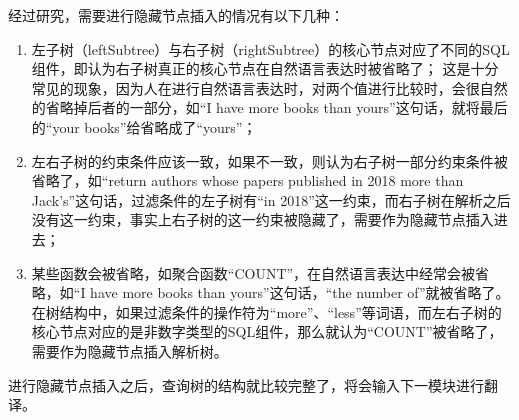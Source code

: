 经过研究，需要进行隐藏节点插入的情况有以下几种：
\begin{enumerate}
    \item 左子树（leftSubtree）与右子树（rightSubtree）的核心节点对应了不同的SQL组件，即认为右子树真正的核心节点在自然语言表达时被省略了\cite{zeng2014breaking}；
    这是十分常见的现象，因为人在进行自然语言表达时，对两个值进行比较时，会很自然的省略掉后者的一部分，如“I have more books than yours”这句话，就将最后的“your books”给省略成了“yours”；
    \item 左右子树的约束条件应该一致，如果不一致，则认为右子树一部分约束条件被省略了，如“return authors whose papers published in 2018 more than Jack’s”这句话，过滤条件的左子树有“in 2018”这一约束，而右子树在解析之后没有这一约束，事实上右子树的这一约束被隐藏了，需要作为隐藏节点插入进去；
    \item 某些函数会被省略，如聚合函数“COUNT”，在自然语言表达中经常会被省略，如“I have more books than yours”这句话，“the number of”就被省略了。在树结构中，如果过滤条件的操作符为“more”、“less”等词语，而左右子树的核心节点对应的是非数字类型的SQL组件，那么就认为“COUNT”被省略了，需要作为隐藏节点插入解析树。
\end{enumerate}

进行隐藏节点插入之后，查询树的结构就比较完整了，将会输入下一模块进行翻译。

